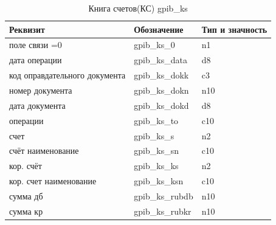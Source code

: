 \begin{table}[!htbp]
    \centering
    \scriptsize
    \caption{Книга счетов(КС) gpib\_ks}
    \begin{tabular}{|l|l|l|} 

                                                                                       \hline
\textbf{Реквизит}               &\textbf{Обозначение}   &\textbf{Тип и значность}   \\ \hline
поле связи =0                   &gpib\_ks\_0            &n1                         \\ \hline
дата операции                   &gpib\_ks\_data         &d8                         \\ \hline
код оправдательного документа   &gpib\_ks\_dokk         &c3                         \\ \hline
номер документа                 &gpib\_ks\_dokn         &n10                        \\ \hline
дата документа                  &gpib\_ks\_dokd         &d8                         \\ \hline
операции                        &gpib\_ks\_to           &c10                        \\ \hline
счет                            &gpib\_ks\_s            &n2                         \\ \hline
счёт наименование               &gpib\_ks\_sn           &c10                        \\ \hline
кор. счёт                       &gpib\_ks\_ks           &n2                         \\ \hline
кор. счет наименование          &gpib\_ks\_ksn          &c10                        \\ \hline
сумма дб                        &gpib\_ks\_rubdb        &n10                        \\ \hline
сумма кр                        &gpib\_ks\_rubkr        &n10                        \\ \hline

    \end{tabular}
\end{table}


